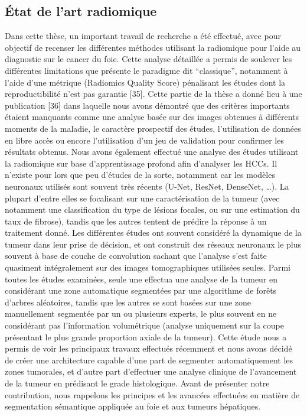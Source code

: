 \documentclass[]{memoir}
\begin{document}
\subsection{État de l’art radiomique}
Dans cette thèse, un important travail de recherche a été effectué, avec pour objectif de recenser les différentes méthodes utilisant la radiomique pour l’aide au diagnostic sur le cancer du foie. Cette analyse détaillée a permis de soulever les différentes limitations que présente le paradigme dit “classique”, notamment à l’aide d’une métrique (Radiomics Quality Score) pénalisant les études dont la reproductibilité n’est pas garantie [35].
Cette partie de la thèse a donné lieu à une publication [36] dans laquelle nous avons démontré que des critères importants étaient manquants comme une analyse basée sur des images obtenues à différents moments de la maladie, le caractère prospectif des études, l’utilisation de données en libre accès ou encore l’utilisation d’un jeu de validation pour confirmer les résultats obtenus.
Nous avons également effectué une analyse des études utilisant la radiomique sur base d’apprentissage profond afin d’analyser les HCCs. Il n’existe pour lors que peu d’études de la sorte, notamment car les modèles neuronaux utilisés sont souvent très récents (U-Net, ResNet, DenseNet, …). La plupart d’entre elles se focalisant sur une caractérisation de la tumeur (avec notamment une classification du type de lésions focales, ou sur une estimation du taux de fibrose), tandis que les autres tentent de prédire la réponse à un traitement donné.
Les différentes études ont souvent considéré la dynamique de la tumeur dans leur prise de décision, et ont construit des réseaux neuronaux le plus souvent à base de couche de convolution sachant que l’analyse s’est faite quasiment intégralement sur des images tomographiques utilisées seules. 
Parmi toutes les études examinées, seule une effectua une analyse de la tumeur en considérant une zone automatique segmentées par une algorithme de forêts d’arbres aléatoires, tandis que les autres se sont basées sur une zone manuellement segmentée par un ou plusieurs experts, le plus souvent en ne considérant pas l’information volumétrique (analyse uniquement sur la coupe présentant le plus grande proportion axiale de la tumeur).
Cette étude nous a permis de voir les principaux travaux effectués récemment et nous avons décidé de créer une architecture capable d’une part de segmenter automatiquement les zones tumorales, et d’autre part d’effectuer une analyse clinique de l’avancement de la tumeur en prédisant le grade histologique.
Avant de présenter notre contribution, nous rappelons les principes et les avancées effectuées en matière de segmentation sémantique appliquée au foie et aux tumeurs hépatiques. 
\end{document}

